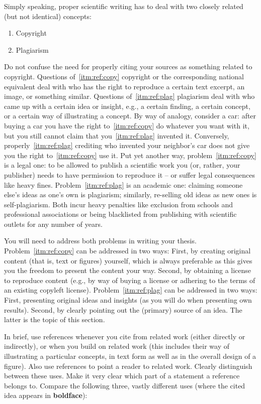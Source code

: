 \documentclass[]{ccs-thesis}
\begin{document}
Simply speaking, proper scientific writing has to deal with two closely related (but not identical) concepts:
\begin{enumerate}[label=\alph*),ref=(\alph*)]
\item\label{itm:ref:copy}
Copyright
\item
Plagiarism\label{itm:ref:plag}
\end{enumerate}
Do not confuse the need for properly citing your sources as something related to copyright.
Questions of~\ref{itm:ref:copy} copyright or the corresponding national equivalent deal with who has the right to reproduce a certain text excerpt, an image, or something similar.
Questions of~\ref{itm:ref:plag} plagiarism deal with who came up with a certain idea or insight, e.g., a certain finding, a certain concept, or a certain way of illustrating a concept.
By way of analogy, consider a car: after buying a car you have the right to~\ref{itm:ref:copy} do whatever you want with it, but you still cannot claim that you~\ref{itm:ref:plag} invented it.
Conversely, properly~\ref{itm:ref:plag} crediting who invented your neighbor's car does not give you the right to~\ref{itm:ref:copy} use it.
Put yet another way, problem~\ref{itm:ref:copy} is a legal one: to be allowed to publish a scientific work you (or, rather, your publisher) needs to have permission to reproduce it -- or suffer legal consequences like heavy fines.
Problem~\ref{itm:ref:plag} is an academic one: claiming someone else's ideas as one's own is plagiarism; similarly, re-selling old ideas as new ones is self-plagiarism.
Both incur heavy penalties like exclusion from schools and professional associations or being blacklisted from publishing with scientific outlets for any number of years.

You will need to address both problems in writing your thesis.
Problem~\ref{itm:ref:copy} can be addressed in two ways:
First, by creating original content (that is, text or figures) yourself, which is always preferable as this gives you the freedom to present the content your way.
Second, by obtaining a license to reproduce content (e.g., by way of buying a license or adhering to the terms of an existing copyleft license).
Problem~\ref{itm:ref:plag} can be addressed in two ways:
First, presenting original ideas and insights (as you will do when presenting own results).
Second, by clearly pointing out the (primary) source of an idea.
The latter is the topic of this section.

In brief, use references whenever you cite from related work (either directly or indirectly), or when you build on related work (this includes their way of illustrating a particular concepts, in text form as well as in the overall design of a figure).
Also use references to point a reader to related work.
Clearly distinguish between these uses.
Make it very clear which part of a statement a reference belongs to.
Compare the following three, vastly different uses (where the cited idea appears in \textbf{boldface}):
\end{document}

